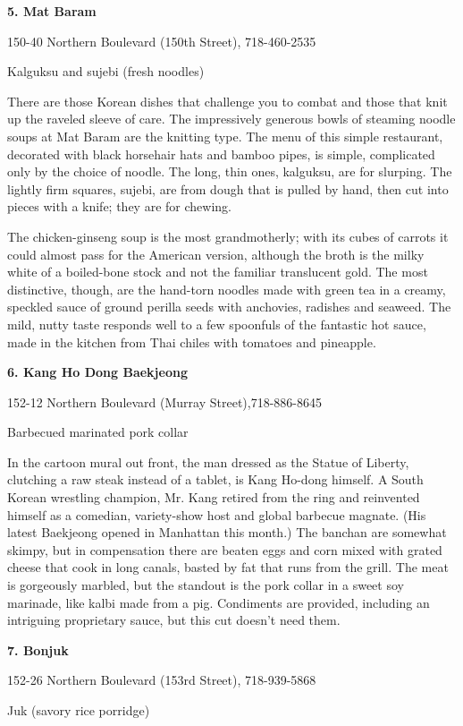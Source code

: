 \textbf{5. Mat Baram}

150-40 Northern Boulevard (150th Street), 718-460-2535

Kalguksu and sujebi (fresh noodles)

There are those Korean dishes that challenge you to combat and those
that knit up the raveled sleeve of care. The impressively generous bowls
of steaming noodle soups at Mat Baram are the knitting type. The menu of
this simple restaurant, decorated with black horsehair hats and bamboo
pipes, is simple, complicated only by the choice of noodle. The long,
thin ones, kalguksu, are for slurping. The lightly firm squares, sujebi,
are from dough that is pulled by hand, then cut into pieces with a
knife; they are for chewing.

The chicken-ginseng soup is the most grandmotherly; with its cubes of
carrots it could almost pass for the American version, although the
broth is the milky white of a boiled-bone stock and not the familiar
translucent gold. The most distinctive, though, are the hand-torn
noodles made with green tea in a creamy, speckled sauce of ground
perilla seeds with anchovies, radishes and seaweed. The mild, nutty
taste responds well to a few spoonfuls of the fantastic hot sauce, made
in the kitchen from Thai chiles with tomatoes and pineapple.

\textbf{6. Kang Ho Dong Baekjeong}

152-12 Northern Boulevard (Murray Street),718-886-8645

Barbecued marinated pork collar

In the cartoon mural out front, the man dressed as the Statue of
Liberty, clutching a raw steak instead of a tablet, is Kang Ho-dong
himself. A South Korean wrestling champion, Mr. Kang retired from the
ring and reinvented himself as a comedian, variety-show host and global
barbecue magnate. (His latest Baekjeong opened in Manhattan this month.)
The banchan are somewhat skimpy, but in compensation there are beaten
eggs and corn mixed with grated cheese that cook in long canals, basted
by fat that runs from the grill. The meat is gorgeously marbled, but the
standout is the pork collar in a sweet soy marinade, like kalbi made
from a pig. Condiments are provided, including an intriguing proprietary
sauce, but this cut doesn't need them.

\textbf{7. Bonjuk}

152-26 Northern Boulevard (153rd Street), 718-939-5868

Juk (savory rice porridge)

